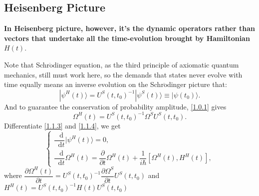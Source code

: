\documentclass[b5paper,10pt,UTF8]{book}
\newcommand*\dd{\mathop{}\!\mathrm{d}}
\numberwithin{equation}{section}
\begin{document}
		\subsection{Heisenberg Picture}
			\textbf{In Heisenberg picture, however, it's the dynamic operators rather than vectors that undertake all the time-evolution brought by Hamiltonian $H(t)$}. \par
			Note that Schr$\ddot{\text{o}}$dinger equation, as the third principle of axiomatic quantum mechanics, still must work here, so the demands that states never evolve with time equally means an inverse evolution on the Schr$\ddot{\text{o}}$dinger picture that:
			\begin{equation}\label{1.1.3}
				|\psi^H(t)\rangle=U^S(t,t_0)^{-1}|\psi^S(t)\rangle\equiv|\psi(t_0)\rangle.
			\end{equation}
			And to guarantee the conservation of probability amplitude, \eqref{1.0.1} gives
			\begin{equation}\label{1.1.4}
				\Omega^H(t)=U^S(t,t_0)^{-1}\Omega^S U^S(t,t_0).
			\end{equation}
			Differentiate \eqref{1.1.3} and \eqref{1.1.4}, we get
			\begin{equation}\label{1.1.5}
				\begin{cases}
					\dfrac{\dd}{\dd t}|\psi^H(t)\rangle=0,\\[0.5em]
					\dfrac{\dd}{\dd t}\Omega^H(t)=\dfrac{\partial}{\partial t}\Omega^H(t)+\dfrac{1}{i\hbar}[\Omega^H(t),H^H(t)],
				\end{cases}
			\end{equation}
			where $\displaystyle \dfrac{\partial \Omega^H(t)}{\partial t}=U^S(t,t_0)^{-1}\dfrac{\partial\Omega^S}{\partial t}U^S(t,t_0)$ and $\displaystyle H^H(t)=U^S(t,t_0)^{-1}H(t)U^S(t,t_0)$
\end{document}
